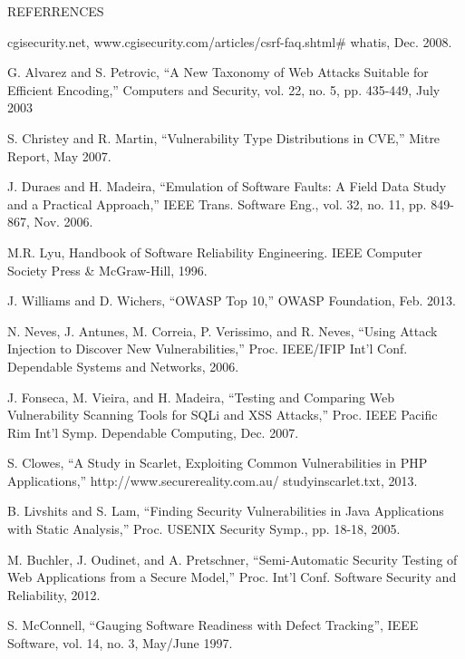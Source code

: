 \documentclass[xcolor=x11names,compress]{beamer}
\renewcommand{\(}{\begin{columns}}
\renewcommand{\)}{\end{columns}}
\newcommand{\<}[1]{\begin{column}{#1}}
\renewcommand{\>}{\end{column}}
\begin{document}
\begin{frame}[allowframebreaks]{REFERRENCES}
	\tiny
{}
\begin{thebibliography}{8}
	
	cgisecurity.net, www.cgisecurity.com/articles/csrf-faq.shtml\#
	whatis, Dec. 2008.
	
	G. Alvarez and S. Petrovic,  ``A New Taxonomy of Web Attacks Suitable for Efficient Encoding,'' Computers and Security, vol. 22,
	no. 5, pp. 435-449, July 2003
	
	
	
	S. Christey and R. Martin,  ``Vulnerability Type Distributions in
	CVE,'' Mitre Report, May 2007.
	
	J. Duraes and H. Madeira,  ``Emulation of Software Faults: A Field
	Data Study and a Practical Approach,'' IEEE Trans. Software Eng.,
	vol. 32, no. 11, pp. 849-867, Nov. 2006.
	
	M.R. Lyu, Handbook of Software Reliability Engineering. IEEE
	Computer Society Press \& McGraw-Hill, 1996.
	
	J. Williams and D. Wichers,  ``OWASP Top 10,'' OWASP Foundation, Feb. 2013.
	
	N. Neves, J. Antunes, M. Correia, P. Verissimo, and R. Neves,
	``Using Attack Injection to Discover New Vulnerabilities,'' Proc.
	IEEE/IFIP Int’l Conf. Dependable Systems and Networks, 2006.
	
	J. Fonseca, M. Vieira, and H. Madeira,  ``Testing and Comparing
	Web Vulnerability Scanning Tools for SQLi and XSS Attacks,''
	Proc. IEEE Pacific Rim Int’l Symp. Dependable Computing, Dec. 2007.
	
	S. Clowes,  ``A Study in Scarlet, Exploiting Common Vulnerabilities in PHP Applications,'' http://www.securereality.com.au/
	studyinscarlet.txt, 2013.
	
	B. Livshits and S. Lam,  ``Finding Security Vulnerabilities in Java
	Applications with Static Analysis,'' Proc. USENIX Security Symp.,
	pp. 18-18, 2005.
	
	M. Buchler, J. Oudinet, and A. Pretschner,  ``Semi-Automatic Security Testing of Web Applications from a Secure Model,'' Proc. Int’l
	Conf. Software Security and Reliability, 2012.
	
	S. McConnell, ``Gauging Software Readiness with Defect
	Tracking'', IEEE Software, vol. 14, no. 3, May/June 1997.
	

\end{thebibliography}
\end{frame}
\end{document}
